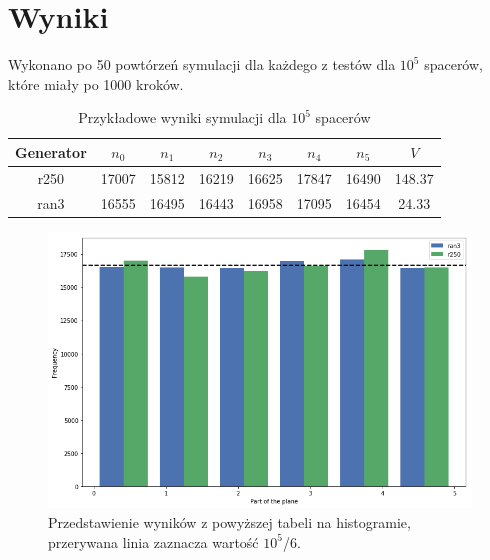 \documentclass[]{scrartcl}
\begin{document}


\clearpage

\section*{Wyniki}

Wykonano po 50 powtórzeń symulacji dla każdego z testów dla $10^5$ spacerów, które miały po 1000 kroków.

\begin{table}[h!]
	\centering
	\caption{Przykładowe wyniki symulacji dla $10^5$ spacerów}
	\begin{tabular}{|c| c| c| c| c| c|c| c|}
		\hline
		Generator & $n_0$ & $n_1$ & $n_2$ & $n_3$ & $n_4$ & $n_5$ & $V$\\ \hline
		 r250  & 17007 & 15812  & 16219 & 16625 & 17847& 16490 & 148.37\\ \hline
		ran3  &	16555  & 16495 & 16443 & 16958 & 17095 & 16454 & 24.33\\ \hline
	\end{tabular}
\end{table}




\begin{figure}[h!]
	\centering
	\includegraphics[width=1\linewidth]{hists}
	\caption{Przedstawienie wyników z powyższej tabeli na histogramie, przerywana linia zaznacza wartość $10^5$/6.}
\end{figure}
\end{document}

